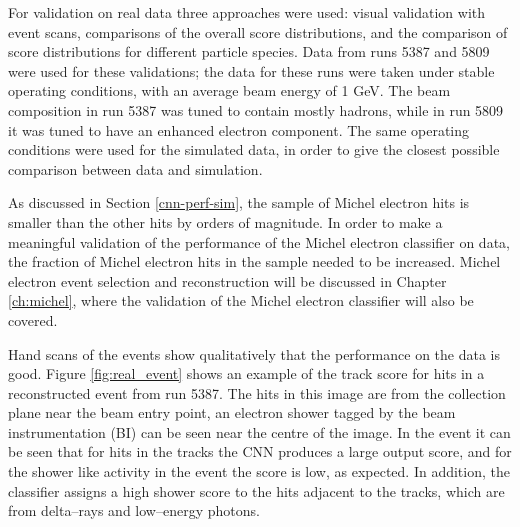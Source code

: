 For validation on real \protodune{} data three approaches were used: visual
validation with event scans, comparisons of the overall score distributions, 
and the comparison of score distributions for different particle species. Data 
from \protodune{} runs 5387 and 5809 were used for these validations; the data 
for these runs were taken under stable operating conditions, with an average 
beam energy of 1 GeV. The beam composition in run 5387 was tuned to contain
mostly hadrons, while in run 5809 it was tuned to have an enhanced electron
component. The same operating conditions were used for the simulated data, in
order to give the closest possible comparison between data and simulation.

As discussed in Section \ref{cnn-perf-sim}, the sample of Michel electron hits
is smaller than the other hits by orders of magnitude. In order to make a
meaningful validation of the performance of the Michel electron classifier on
data, the fraction of Michel electron hits in the sample needed to be increased.
Michel electron event selection and reconstruction will be discussed in Chapter
\ref{ch:michel}, where the validation of the Michel electron classifier will
also be covered.

Hand scans of the events show qualitatively that the performance on the data is
good. Figure \ref{fig:real_event} shows an example of the track score for hits
in a reconstructed event from run 5387. The hits in this image are from the
collection plane near the beam entry point, an electron shower tagged by the
beam instrumentation (BI) can be seen near the centre of the image. In the event
it can be seen that for hits in the tracks the CNN produces a large output 
score, and for the shower like activity in the event the score is low, as
expected. In addition, the classifier assigns a high shower score to the hits 
adjacent to the tracks, which are from delta--rays and low--energy photons.


